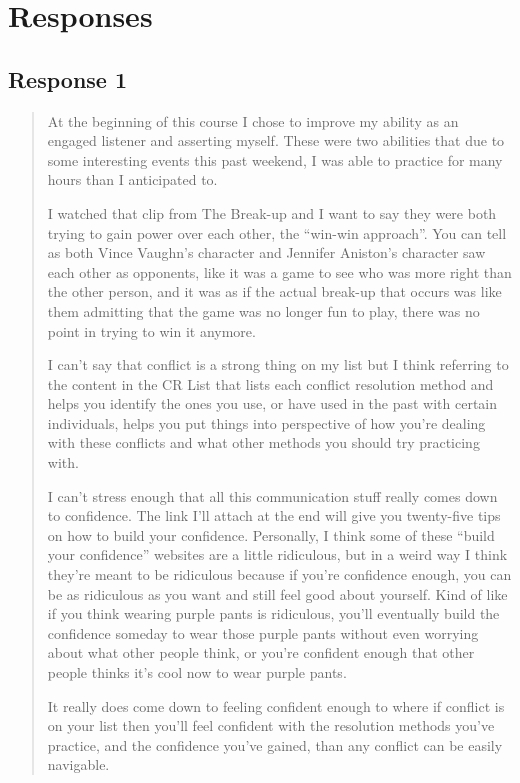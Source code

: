 
\section{Responses}
  \subsection{Response 1}
    \begin{quotation}
      At the beginning of this course I chose to improve my ability as an
        engaged listener and asserting myself. These were two abilities that due
        to some interesting events this past weekend, I was able to practice for
        many hours than I anticipated to.

      I watched that clip from The Break-up and I want to say they were both
        trying to gain power over each other, the ``win-win approach''. You can
        tell as both Vince Vaughn's character and Jennifer Aniston's character
        saw each other as opponents, like it was a game to see who was more
        right than the other person, and it was as if the actual break-up that
        occurs was like them admitting that the game was no longer fun to play,
        there was no point in trying to win it anymore.

      I can't say that conflict is a strong thing on my list but I think
        referring to the content in the CR List that lists each conflict
        resolution method and helps you identify the ones you use, or have used
        in the past with certain individuals, helps you put things into
        perspective of how you're dealing with these conflicts and what other
        methods you should try practicing with.

      I can't stress enough that all this communication stuff really comes down
        to confidence. The link I'll attach at the end will give you twenty-five
        tips on how to build your confidence. Personally, I think some of these
        ``build your confidence'' websites are a little ridiculous, but in a
        weird way I think they're meant to be ridiculous because if you're
        confidence enough, you can be as ridiculous as you want and still feel
        good about yourself. Kind of like if you think wearing purple pants is
        ridiculous, you'll eventually build the confidence someday to wear those
        purple pants without even worrying about what other people think, or
        you're confident enough that other people thinks it's cool now to wear
        purple pants.

      It really does come down to feeling confident enough to where if conflict
        is on your list then you'll feel confident with the resolution methods
        you've practice, and the confidence you've gained, than any conflict can
        be easily navigable.
    \end{quotation}

